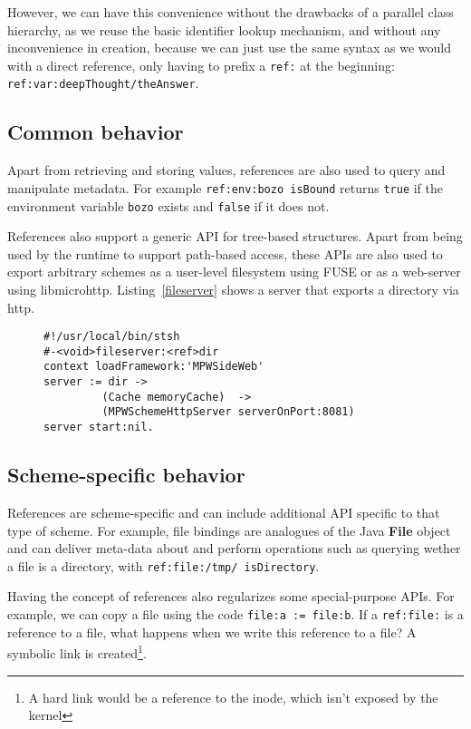 \documentclass[preprint,authoryear]{llncs}
\begin{document}
However, we can have this convenience without the drawbacks of a parallel class
hierarchy, as we reuse the basic identifier lookup mechanism, and without any
inconvenience in creation, because we can just use the same syntax as we would
with a direct reference, only having to prefix a {\tt ref:} at the beginning:  {\tt ref:var:deepThought/theAnswer}.


\subsection{Common behavior}
\label{common-reference-behavior}
Apart from retrieving and storing values, references are also used to query and manipulate
metadata.  For example {\tt ref:env:bozo isBound} returns {\tt true} if the environment
variable {\tt bozo} exists and {\tt false} if it does not.

References also support a generic API for tree-based structures.   Apart from being used
by the runtime to support path-based access, these APIs are also used to export arbitrary
schemes as a user-level filesystem using FUSE or as a web-server using libmicrohttp.
Listing~\ref{fileserver} shows a server that exports a directory via http.

\begin{figure}[htbp]
\begin{lstlisting}[style=L,label=fileserver,caption=Exporting a directory via http.]
#!/usr/local/bin/stsh
#-<void>fileserver:<ref>dir
context loadFramework:'MPWSideWeb'
server := dir -> 
         (Cache memoryCache)  -> 
         (MPWSchemeHttpServer serverOnPort:8081)
server start:nil.
\end{lstlisting}
\end{figure}



\subsection{Scheme-specific behavior}

References are scheme-specific and can include additional API specific to that type of scheme.
For example, file bindings are analogues of the Java {\bf File} object and can deliver
meta-data about and perform operations such as querying wether a file is a directory, with
{\tt ref:file:/tmp/ isDirectory}.


Having the concept of references also regularizes some special-purpose APIs.  For example,
we can copy a file using the code {\tt file:a := file:b}.  If a {\tt ref:file:} is a reference to a file, what
happens when we write this reference to a file?  A symbolic link is created\footnote{A hard link
would be a reference to the inode, which isn't exposed by the kernel}.
\end{document}
